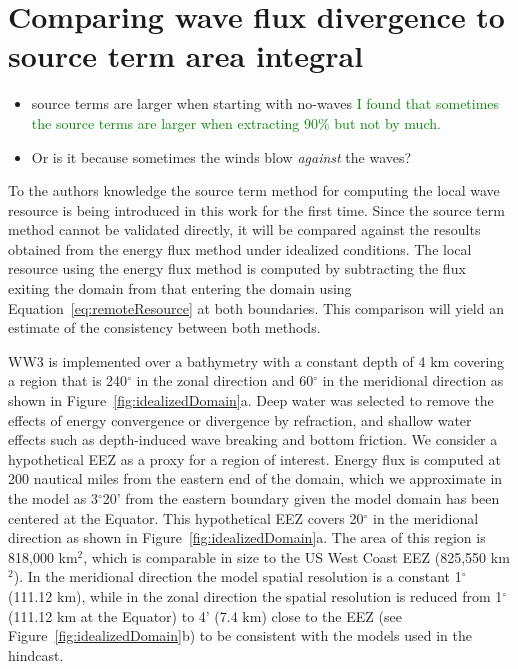 \section{Comparing wave flux divergence to source term area integral}\label{appendix:flux-vs-area}

\hline


\begin{itemize}
\item source terms are larger when starting with no-waves  \textcolor{green}{I found that sometimes the source terms are larger when extracting 90\% but not by much.}
\item Or is it because sometimes the winds blow {\em against} the waves?
\end{itemize}

\hline


To the authors knowledge the source term method for computing the local wave resource is being introduced in this work for the first time. Since the source term method cannot be validated directly, it will be compared against the resoults obtained from the energy flux method under idealized conditions. The local resource using the energy flux method is computed by subtracting the flux exiting the domain from that entering the domain using Equation~\eqref{eq:remoteResource} at both boundaries. This comparison will yield an estimate of the consistency between both methods.

WW3 is implemented over a bathymetry with a constant depth of 4 km covering a region that is 240$^{\circ}$ in the zonal direction and 60$^{\circ}$ in the meridional direction as shown in Figure~\ref{fig:idealizedDomain}a. Deep water was selected to remove the effects of energy convergence or divergence by refraction, and shallow water effects such as depth-induced wave breaking and bottom friction. We consider a hypothetical EEZ as a proxy for a region of interest. Energy flux is computed at 200 nautical miles from the eastern end of the domain, which we approximate in the model as 3$^{\circ}$20’ from the eastern boundary given the model domain has been centered at the Equator. This hypothetical EEZ covers 20$^{\circ}$ in the meridional direction as shown in Figure~\ref{fig:idealizedDomain}a. The area of this region is 818,000 km$^{2}$, which is comparable in size to the US West Coast EEZ (825,550 km$^{2}$). In the meridional direction the model spatial resolution is a constant 1$^{\circ}$ (111.12 km), while in the zonal direction the spatial resolution is reduced from 1$^{\circ}$ (111.12 km at the Equator) to 4’ (7.4 km) close to the EEZ (see Figure~\ref{fig:idealizedDomain}b) to be consistent with the models used in the hindcast.
 
